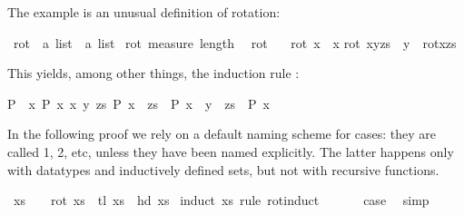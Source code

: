 \begin{isabellebody}
\begin{isamarkuptext}
The example is an unusual definition of rotation:%
\end{isamarkuptext}%
\isamarkuptrue%
\ rot\ {\isacharcolon}{\isacharcolon}\ {\isachardoublequote}{\isacharprime}a\ list\ {\isasymRightarrow}\ {\isacharprime}a\ list{\isachardoublequote}\isanewline
\isamarkupfalse%
\ rot\ {\isachardoublequote}measure\ length{\isachardoublequote}\ \ %
\isanewline
{\isachardoublequote}rot\ {\isacharbrackleft}{\isacharbrackright}\ {\isacharequal}\ {\isacharbrackleft}{\isacharbrackright}{\isachardoublequote}\isanewline
{\isachardoublequote}rot\ {\isacharbrackleft}x{\isacharbrackright}\ {\isacharequal}\ {\isacharbrackleft}x{\isacharbrackright}{\isachardoublequote}\isanewline
{\isachardoublequote}rot\ {\isacharparenleft}x{\isacharhash}y{\isacharhash}zs{\isacharparenright}\ {\isacharequal}\ y\ {\isacharhash}\ rot{\isacharparenleft}x{\isacharhash}zs{\isacharparenright}{\isachardoublequote}\isamarkupfalse%
%
\begin{isamarkuptext}%
\noindent This yields, among other things, the induction rule
: \begin{isabelle}%
{\isasymlbrakk}P\ {\isacharbrackleft}{\isacharbrackright}{\isacharsemicolon}\ {\isasymAnd}x{\isachardot}\ P\ {\isacharbrackleft}x{\isacharbrackright}{\isacharsemicolon}\ {\isasymAnd}x\ y\ zs{\isachardot}\ P\ {\isacharparenleft}x\ {\isacharhash}\ zs{\isacharparenright}\ {\isasymLongrightarrow}\ P\ {\isacharparenleft}x\ {\isacharhash}\ y\ {\isacharhash}\ zs{\isacharparenright}{\isasymrbrakk}\ {\isasymLongrightarrow}\ P\ x%
\end{isabelle}
In the following proof we rely on a default naming scheme for cases: they are
called 1, 2, etc, unless they have been named explicitly. The latter happens
only with datatypes and inductively defined sets, but not with recursive
functions.%
\end{isamarkuptext}%
\isamarkuptrue%
\ {\isachardoublequote}xs\ {\isasymnoteq}\ {\isacharbrackleft}{\isacharbrackright}\ {\isasymLongrightarrow}\ rot\ xs\ {\isacharequal}\ tl\ xs\ {\isacharat}\ {\isacharbrackleft}hd\ xs{\isacharbrackright}{\isachardoublequote}\isanewline
\isamarkupfalse%
\ {\isacharparenleft}induct\ xs\ rule{\isacharcolon}\ rot{\isachardot}induct{\isacharparenright}\isanewline
\ \ \isamarkupfalse%
\ {}\ \isamarkupfalse%
\ {\isacharquery}case\ \isamarkupfalse%
\ simp\isanewline
\isamarkupfalse%

\end{isabellebody}
